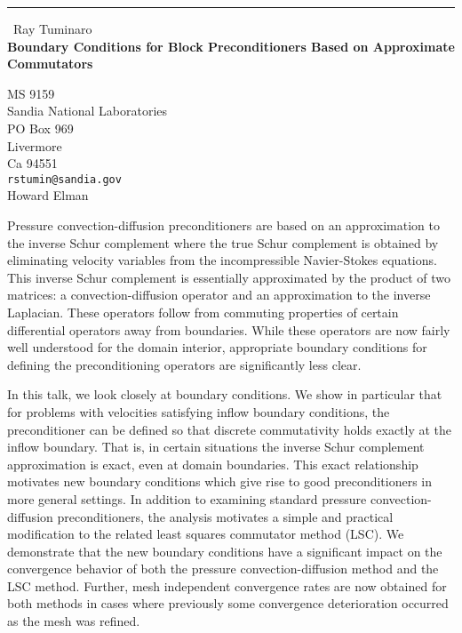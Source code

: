 \documentclass{report}
\begin{document}
\begin{center}
\rule{6in}{1pt} \
{\large Ray Tuminaro \\
{\bf Boundary Conditions for Block Preconditioners Based on Approximate Commutators}}

MS 9159 \\ Sandia National Laboratories \\ PO Box 969 \\ Livermore \\ Ca 94551
\\
{\tt rstumin@sandia.gov}\\
Howard Elman\end{center}

Pressure convection-diffusion preconditioners are based on an approximation to the
inverse Schur complement where the true Schur complement is obtained by eliminating
velocity variables from the incompressible Navier-Stokes equations. This
inverse Schur complement is essentially approximated by the product of two
matrices: a convection-diffusion operator and an approximation to the inverse
Laplacian. These operators follow from commuting properties of certain
differential operators away from boundaries. While these operators are now fairly
well understood for the domain interior, appropriate boundary conditions for
defining the preconditioning operators are significantly less clear.

In this talk, we look closely at boundary conditions. We show in particular that
for problems with velocities satisfying inflow boundary conditions, the
preconditioner can be defined so that discrete commutativity holds exactly at
the inflow boundary. That is, in certain situations the inverse Schur complement
approximation is exact, even at domain boundaries. This exact relationship
motivates new boundary conditions which give rise to good preconditioners in more
general settings. In addition to examining standard pressure convection-diffusion
preconditioners, the analysis motivates a simple and practical modification to the
related least squares commutator method (LSC). We demonstrate that the new boundary
conditions have a significant impact on the convergence behavior of both the
pressure convection-diffusion method and the LSC method. Further, mesh independent
convergence rates are now obtained for both methods in cases where previously some
convergence deterioration occurred as the mesh was refined.
\end{document}
